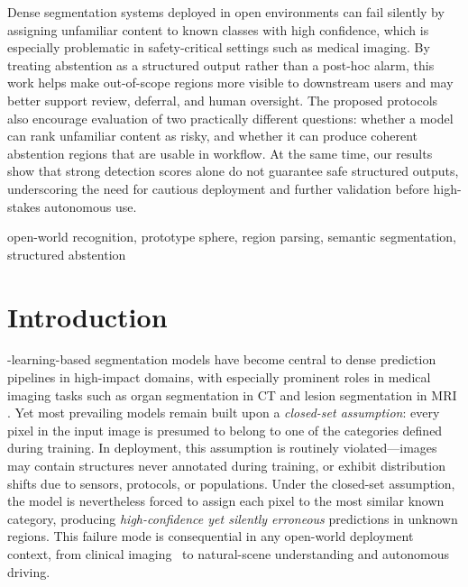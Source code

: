 \documentclass[journal]{IEEEtai}
\begin{document}
\begin{IEEEImpStatement}
Dense segmentation systems deployed in open environments can fail silently by assigning unfamiliar content to known classes with high confidence, which is especially problematic in safety-critical settings such as medical imaging. By treating abstention as a structured output rather than a post-hoc alarm, this work helps make out-of-scope regions more visible to downstream users and may better support review, deferral, and human oversight. The proposed protocols also encourage evaluation of two practically different questions: whether a model can rank unfamiliar content as risky, and whether it can produce coherent abstention regions that are usable in workflow. At the same time, our results show that strong detection scores alone do not guarantee safe structured outputs, underscoring the need for cautious deployment and further validation before high-stakes autonomous use.
\end{IEEEImpStatement}

\begin{IEEEkeywords}
open-world recognition, prototype sphere, region parsing, semantic segmentation, structured abstention
\end{IEEEkeywords}

\section{Introduction}
\label{sec:intro}


-learning-based segmentation models have become central to dense
prediction pipelines in high-impact domains, with especially prominent roles in medical
imaging tasks such as organ segmentation in CT and lesion segmentation in MRI
\cite{zhao2023efficientmulti,zeineldin2022multimodalcnn}. Yet most prevailing models
remain built upon a \emph{closed-set assumption}: every pixel in the input image is
presumed to belong to one of the categories defined during training. In deployment,
this assumption is routinely violated---images may contain structures never annotated
during training, or exhibit distribution shifts due to sensors, protocols, or
populations. Under the closed-set assumption, the model is nevertheless forced to
assign each pixel to the most similar known category, producing
\emph{high-confidence yet silently erroneous} predictions in unknown regions.
This failure mode is consequential in any open-world deployment context,
from clinical imaging~\cite{kompa2021secondopinion,li2025evaluationuncertainty,miranda2024exploringtransformer}
to natural-scene understanding and autonomous driving.
\end{document}
